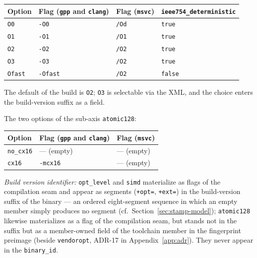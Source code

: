 \begin{scriptsize}
\begin{longtable}{@{}>{\raggedright\arraybackslash}p{2.0cm} >{\raggedright\arraybackslash}p{3.4cm} >{\raggedright\arraybackslash}p{2.6cm} >{\raggedright\arraybackslash}p{5.5cm}@{}}
\toprule
Option & Flag (\texttt{gpp} and \texttt{clang}) & Flag (\texttt{msvc}) & \texttt{ieee754\_\allowbreak{}deterministic} \\
\midrule
\endhead%
\texttt{O0} & \texttt{-O0} & \texttt{/Od} & \texttt{true} \\
\texttt{O1} & \texttt{-O1} & \texttt{/O1} & \texttt{true} \\
\texttt{O2} & \texttt{-O2} & \texttt{/O2} & \texttt{true} \\
\texttt{O3} & \texttt{-O3} & \texttt{/O2} & \texttt{true} \\
\texttt{Ofast} & \texttt{-Ofast} & \texttt{/O2} & \texttt{false} \\
\bottomrule
\end{longtable}
\end{scriptsize}

The default of the build is \texttt{O2}; \texttt{O3} is selectable via the XML, and the choice enters the build-version suffix as a field.

The two options of the sub-axis \texttt{atomic128}:

\begin{scriptsize}
\begin{longtable}{@{}>{\raggedright\arraybackslash}p{3.0cm} >{\raggedright\arraybackslash}p{5.2cm} >{\raggedright\arraybackslash}p{5.3cm}@{}}
\toprule
Option & Flag (\texttt{gpp} and \texttt{clang}) & Flag (\texttt{msvc}) \\
\midrule
\endhead%
\texttt{no\_\allowbreak{}cx16} & --- (empty) & --- (empty) \\
\texttt{cx16} & \texttt{-mcx16} & --- (empty) \\
\bottomrule
\end{longtable}
\end{scriptsize}

\emph{Build version identifier:} \texttt{opt\_\allowbreak{}level} and \texttt{simd} materialize as flags of the compilation seam and appear as segments (\texttt{+opt=}, \texttt{+ext=}) in the build-version suffix of the binary --- an ordered eight-segment sequence in which an empty member simply produces no segment (cf.\ Section~\ref{sec:stamp-model}); \texttt{atomic128} likewise materializes as a flag of the compilation seam, but stands not in the suffix but as a member-owned field of the toolchain member in the fingerprint preimage (beside \texttt{vendoropt}, ADR-17 in Appendix~\ref{app:adr}). They never appear in the \texttt{binary\_\allowbreak{}id}.

